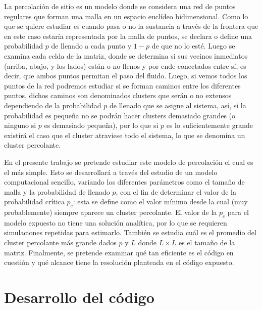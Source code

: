 \documentclass{article}
\begin{document}
\begin{multicols}{2}
La percolación de sitio es un modelo donde se considera una red de puntos regulares que forman una malla en un espacio euclídeo bidimensional. Como lo que se quiere estudiar es cuando pasa o no la sustancia a través de la frontera que en este caso estaría representada por la malla de puntos, se declara o define una probabilidad $p$ de llenado a cada punto y $1-p$ de que no lo esté. Luego se examina cada celda de la matriz, donde se determina si sus vecinos inmediatos (arriba, abajo, y los lados) están o no llenos y por ende conectados entre sí, es decir,  que ambos puntos permitan el paso del fluido. Luego, si vemos todos los puntos de la red podremos estudiar si se forman caminos entre los diferentes puntos, dichos caminos son denominados clusters que serán o no extensos dependiendo de la probabilidad $p$ de llenado que se asigne al sistema, así, si la probabilidad es pequeña no se podrán hacer clusters demasiado grandes (o ninguno si $p$ es demasiado pequeña), por lo que si $p$ es lo suficientemente grande existirá el caso que el cluster atraviese todo el sistema, lo que se denomina un cluster percolante. 

En el presente trabajo se pretende estudiar este modelo de percolación el cual es el más simple. Esto se desarrollará a través del estudio de un modelo computacional sencillo, variando los diferentes parámetros como el tamaño de malla y la probabilidad de llenado $p$, con el fin de determinar el valor de la probabilidad crítica $p_c$: esta se define como el valor mínimo desde la cual (muy probablemente) siempre aparece un cluster percolante. El valor de la $p_c$ para el modelo expuesto no tiene una solución analítica, por lo que se requieren simulaciones repetidas para estimarlo.     También se estudia cuál es el promedio del cluster percolante más grande dados $p$ y $L$ donde $L\times L$ es el tamaño de la matriz. Finalmente, se pretende examinar qué tan eficiente es el código en cuestión y qué alcance tiene la resolución planteada en el código expuesto.

\section{Desarrollo del código} 


\end{multicols}
\end{document}
